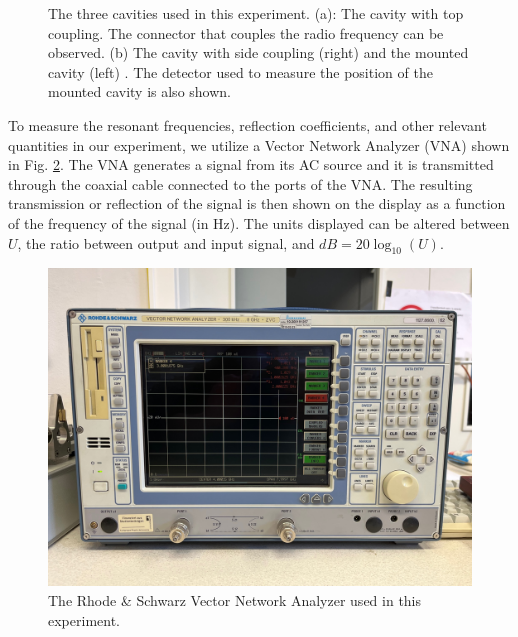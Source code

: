 \documentclass[a4paper]{report}
\numberwithin{equation}{section}
\begin{document}
\begin{figure}[hbt!]
	\centering
	\quad

	\caption{The three cavities used in this experiment. (a): The cavity with
	top coupling. The connector that couples the radio frequency can be
	observed. (b) The cavity with side coupling (right) and the mounted cavity
	(left) \cite*{Switka22}. The detector used to measure the position of the
	mounted cavity is also shown.}
	\label{fig:cavities_equipment}
\end{figure}

To measure the resonant frequencies, reflection coefficients, and other relevant
quantities in our experiment, we utilize a Vector Network Analyzer (VNA) shown
in Fig. \ref{fig:VNA}. The VNA generates a signal from its AC source and it is
transmitted through the coaxial cable connected to the ports of the VNA. The
resulting transmission or reflection of the signal is then shown on the display
as a function of the frequency of the signal (in Hz). The units displayed can be
altered between $U$, the ratio between output and input signal, and $dB = 20
\log_{10}(U)$. \par  

\begin{figure}[hbt!]
	\centering
	\includegraphics[width=0.5\columnwidth]{VNA.jpg}
	\caption{The Rhode \& Schwarz Vector Network Analyzer used in this experiment.}

	\label{fig:VNA}
\end{figure}
\end{document}
